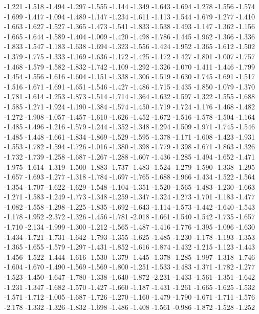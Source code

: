 \documentclass[9pt]{article}
\theoremstyle{plain}
\theoremstyle{definition}
\theoremstyle{remark}
\numberwithin{equation}{section}
\begin{document}
-1.221
-1.518
-1.494
-1.297
-1.555
-1.144
-1.349
-1.643
-1.694
-1.278
-1.556
-1.574
-1.699
-1.417
-1.094
-1.489
-1.147
-1.234
-1.611
-1.113
-1.544
-1.679
-1.277
-1.410
-1.663
-1.627
-1.527
-1.365
-1.473
-1.541
-1.833
-1.538
-1.493
-1.147
-1.362
-1.156
-1.665
-1.644
-1.589
-1.404
-1.009
-1.420
-1.498
-1.786
-1.445
-1.962
-1.366
-1.336
-1.833
-1.547
-1.183
-1.638
-1.694
-1.323
-1.556
-1.424
-1.952
-1.365
-1.612
-1.502
-1.379
-1.775
-1.333
-1.169
-1.636
-1.172
-1.425
-1.172
-1.427
-1.801
-1.007
-1.757
-1.468
-1.579
-1.582
-1.832
-1.742
-1.109
-1.292
-1.326
-1.070
-1.411
-1.446
-1.799
-1.454
-1.556
-1.616
-1.604
-1.151
-1.338
-1.306
-1.519
-1.630
-1.745
-1.691
-1.517
-1.516
-1.671
-1.691
-1.651
-1.546
-1.427
-1.486
-1.715
-1.435
-1.850
-1.079
-1.370
-1.781
-1.614
-1.253
-1.873
-1.514
-1.714
-1.364
-1.632
-1.597
-1.322
-1.555
-1.688
-1.585
-1.271
-1.924
-1.190
-1.384
-1.574
-1.450
-1.719
-1.724
-1.176
-1.468
-1.482
-1.272
-1.908
-1.057
-1.457
-1.610
-1.626
-1.452
-1.672
-1.516
-1.578
-1.504
-1.164
-1.485
-1.496
-1.216
-1.579
-1.244
-1.352
-1.348
-1.294
-1.509
-1.971
-1.745
-1.546
-1.485
-1.448
-1.661
-1.834
-1.869
-1.529
-1.595
-1.378
-1.171
-1.608
-1.423
-1.931
-1.553
-1.782
-1.594
-1.726
-1.016
-1.380
-1.398
-1.779
-1.398
-1.671
-1.863
-1.326
-1.732
-1.739
-1.258
-1.687
-1.267
-1.288
-1.607
-1.436
-1.285
-1.494
-1.652
-1.471
-1.975
-1.614
-1.319
-1.500
-1.883
-1.737
-1.483
-1.524
-1.279
-1.590
-1.338
-1.295
-1.657
-1.693
-1.277
-1.318
-1.784
-1.697
-1.765
-1.688
-1.966
-1.434
-1.522
-1.564
-1.354
-1.707
-1.622
-1.629
-1.548
-1.104
-1.351
-1.520
-1.565
-1.483
-1.230
-1.663
-1.271
-1.583
-1.249
-1.773
-1.348
-1.259
-1.347
-1.324
-1.273
-1.701
-1.183
-1.477
-1.082
-1.558
-1.298
-1.225
-1.835
-1.692
-1.643
-1.114
-1.573
-1.442
-1.640
-1.543
-1.178
-1.952
-2.372
-1.326
-1.456
-1.781
-2.018
-1.661
-1.540
-1.542
-1.735
-1.657
-1.710
-2.134
-1.999
-1.300
-1.212
-1.565
-1.487
-1.416
-1.776
-1.395
-1.096
-1.630
-1.434
-1.721
-1.731
-1.642
-1.793
-1.355
-1.625
-1.485
-1.230
-1.178
-1.193
-1.353
-1.365
-1.655
-1.579
-1.297
-1.431
-1.852
-1.616
-1.874
-1.432
-1.215
-1.123
-1.443
-1.456
-1.522
-1.444
-1.616
-1.530
-1.379
-1.445
-1.378
-1.285
-1.997
-1.318
-1.746
-1.604
-1.670
-1.490
-1.569
-1.569
-1.800
-1.251
-1.533
-1.483
-1.371
-1.782
-1.277
-1.523
-1.450
-1.647
-1.780
-1.338
-1.640
-1.872
-2.231
-1.433
-1.561
-1.351
-1.642
-1.231
-1.347
-1.682
-1.570
-1.427
-1.660
-1.187
-1.431
-1.261
-1.665
-1.625
-1.532
-1.571
-1.712
-1.005
-1.687
-1.726
-1.270
-1.160
-1.479
-1.790
-1.671
-1.711
-1.576
-2.178
-1.332
-1.326
-1.832
-1.698
-1.486
-1.408
-1.561
-0.986
-1.872
-1.528
-1.252
\end{document}
